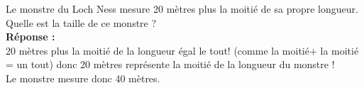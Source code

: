 Le monstre du Loch Ness mesure 20 mètres plus la moitié de sa propre longueur.
Quelle est la taille de ce monstre ?\\

\textbf{Réponse :}\\

20 mètres plus la moitié de la longueur égal le tout! (comme la moitié+ la moitié = un tout)
donc 20 mètres représente la moitié de la longueur du monstre !\\
Le monstre mesure donc 40 mètres.
